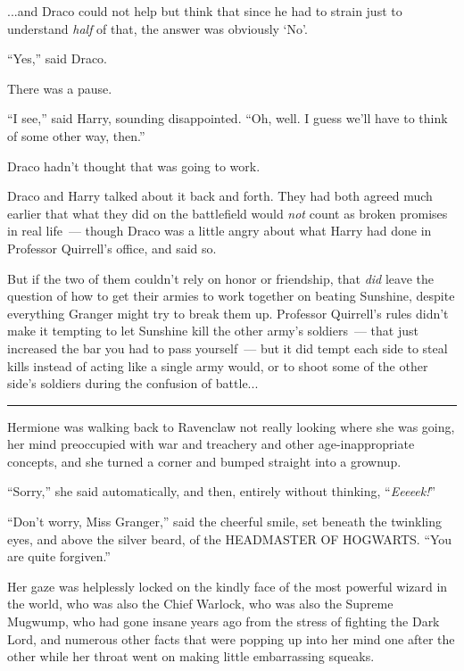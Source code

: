...and Draco could not help but think that since he had to strain just to understand \emph{half} of that, the answer was obviously `No'.

``Yes,'' said Draco.

There was a pause.

``I see,'' said Harry, sounding disappointed. ``Oh, well. I guess we'll have to think of some other way, then.''

Draco hadn't thought that was going to work.

Draco and Harry talked about it back and forth. They had both agreed much earlier that what they did on the battlefield would \emph{not} count as broken promises in real life~--- though Draco was a little angry about what Harry had done in Professor Quirrell's office, and said so.

But if the two of them couldn't rely on honor or friendship, that \emph{did} leave the question of how to get their armies to work together on beating Sunshine, despite everything Granger might try to break them up. Professor Quirrell's rules didn't make it tempting to let Sunshine kill the other army's soldiers~--- that just increased the bar you had to pass yourself~--- but it did tempt each side to steal kills instead of acting like a single army would, or to shoot some of the other side's soldiers during the confusion of battle...

\begin{center}\rule{3in}{0.4pt}\end{center}

Hermione was walking back to Ravenclaw not really looking where she was going, her mind preoccupied with war and treachery and other age-inappropriate concepts, and she turned a corner and bumped straight into a grownup.

``Sorry,'' she said automatically, and then, entirely without thinking, ``\emph{Eeeeek!}''

``Don't worry, Miss Granger,'' said the cheerful smile, set beneath the twinkling eyes, and above the silver beard, of the HEADMASTER OF HOGWARTS. ``You are quite forgiven.''

Her gaze was helplessly locked on the kindly face of the most powerful wizard in the world, who was also the Chief Warlock, who was also the Supreme Mugwump, who had gone insane years ago from the stress of fighting the Dark Lord, and numerous other facts that were popping up into her mind one after the other while her throat went on making little embarrassing squeaks.

